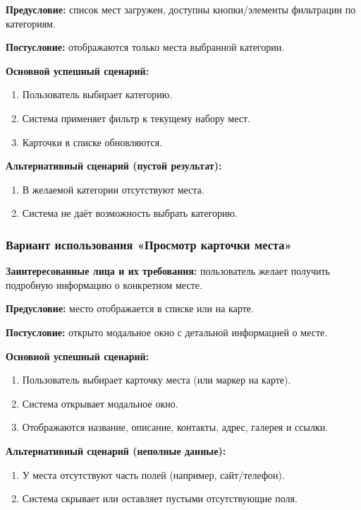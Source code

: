 \textbf{Предусловие:} список мест загружен, доступны кнопки/элементы фильтрации по категориям.

\textbf{Постусловие:} отображаются только места выбранной категории.

\textbf{Основной успешный сценарий:}
\begin{enumerate}
	\item Пользователь выбирает категорию.
	\item Система применяет фильтр к текущему набору мест.
	\item Карточки в списке обновляются.
\end{enumerate}

\textbf{Альтернативный сценарий (пустой результат):}
\begin{enumerate}
	\item В желаемой категории отсутствуют места.
	\item Система не даёт возможность выбрать категорию.
\end{enumerate}

\subsubsection{Вариант использования «Просмотр карточки места»}
\textbf{Заинтересованные лица и их требования:} пользователь желает получить подробную информацию о конкретном месте.

\textbf{Предусловие:} место отображается в списке или на карте.

\textbf{Постусловие:} открыто модальное окно с детальной информацией о месте.

\textbf{Основной успешный сценарий:}
\begin{enumerate}
	\item Пользователь выбирает карточку места (или маркер на карте).
	\item Система открывает модальное окно.
	\item Отображаются название, описание, контакты, адрес, галерея и ссылки.
\end{enumerate}

\textbf{Альтернативный сценарий (неполные данные):}
\begin{enumerate}
	\item У места отсутствуют часть полей (например, сайт/телефон).
	\item Система скрывает или оставляет пустыми отсутствующие поля.
\end{enumerate}

